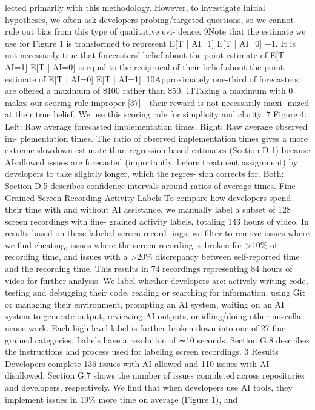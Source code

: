 lected primarily with this methodology. However, to investigate initial hypotheses, we often ask
developers probing/targeted questions, so we cannot rule out bias from this type of qualitative evi-
dence.
9Note that the estimate we use for Figure 1 is transformed to represent E[T | AI=1]
E[T | AI=0] −1. It is not necessarily
true that forecasters’ belief about the point estimate of E[T | AI=1]
E[T | AI=0] is equal to the reciprocal of their belief about
the point estimate of E[T | AI=0]
E[T | AI=1].
10Approximately one-third of forecasters are offered a maximum of \$100 rather than \$50.
11Taking a maximum with 0 makes our scoring rule improper [37]—their reward is not necessarily maxi-
mized at their true belief. We use this scoring rule for simplicity and clarity.
7
Figure 4: Left: Raw average forecasted implementation times. Right: Raw average observed im-
plementation times. The ratio of observed implementation times gives a more extreme slowdown
estimate than regression-based estimates (Section D.1) because AI-allowed issues are forecasted
(importantly, before treatment assignment) by developers to take slightly longer, which the regres-
sion corrects for. Both: Section D.5 describes confidence intervals around ratios of average times.
Fine-Grained Screen Recording Activity Labels
To compare how developers spend their time
with and without AI assistance, we manually label a subset of 128 screen recordings with fine-
grained activity labels, totaling 143 hours of video. In results based on these labeled screen record-
ings, we filter to remove issues where we find cheating, issues where the screen recording is broken
for >10\% of recording time, and issues with a >20\% discrepancy between self-reported time and
the recording time. This results in 74 recordings representing 84 hours of video for further analysis.
We label whether developers are: actively writing code, testing and debugging their code, reading
or searching for information, using Git or managing their environment, prompting an AI system,
waiting on an AI system to generate output, reviewing AI outputs, or idling/doing other miscella-
neous work. Each high-level label is further broken down into one of 27 fine-grained categories.
Labels have a resolution of ∼10 seconds. Section G.8 describes the instructions and process used
for labeling screen recordings.
3
Results
Developers complete 136 issues with AI-allowed and 110 issues with AI-disallowed. Section G.7
shows the number of issues completed across repositories and developers, respectively. We find that
when developers use AI tools, they implement issues in 19\% more time on average (Figure 1), and
